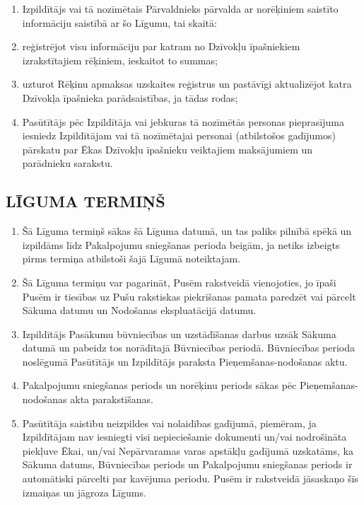 \begin{multicols}{2}
\begin{enumerate}
	\item Izpildītājs vai tā nozīmētais Pārvaldnieks pārvalda ar norēķiniem saistīto informāciju saistībā ar šo Līgumu, tai skaitā:
	\item reģistrējot visu informāciju par katram no Dzīvokļu īpašniekiem izrakstītajiem rēķiniem, ieskaitot to summas;
	\item uzturot Rēķinu apmaksas uzskaites reģistrus un pastāvīgi aktualizējot katra Dzīvokļa īpašnieka parādsaistības, ja tādas rodas;
	\item Pasūtītājs pēc Izpildītāja vai jebkuras tā nozīmētās personas pieprasījuma iesniedz Izpildītājam vai tā nozīmētajai personai (atbilstošos gadījumos) pārskatu par Ēkas Dzīvokļu īpašnieku veiktajiem maksājumiem un parādnieku sarakstu.
\end{enumerate}

\subsection{LĪGUMA TERMIŅŠ}
\begin{enumerate}
	\item Šā Līguma termiņš sākas šā Līguma datumā, un tas paliks pilnībā spēkā un izpildāms līdz Pakalpojumu sniegšanas perioda beigām, ja netiks izbeigts pirms termiņa atbilstoši šajā Līgumā noteiktajam.
	\item Šā Līguma termiņu var pagarināt, Pusēm rakstveidā vienojoties, jo īpaši Pusēm ir tiesības uz Pušu rakstiskas piekrišanas pamata paredzēt vai pārcelt Sākuma datumu un Nodošanas ekspluatācijā datumu.
	\item Izpildītājs Pasākumu būvniecības un uzstādīšanas darbus uzsāk Sākuma datumā un pabeidz tos norādītajā Būvniecības periodā. Būvniecības perioda noslēgumā Pasūtītājs un Izpildītājs paraksta Pieņemšanas-nodošanas aktu.
	\item Pakalpojumu sniegšanas periods un norēķinu periods sākas pēc Pieņemšanas-nodošanas akta parakstīšanas.
	\item Pasūtītāja saistību neizpildes vai nolaidības gadījumā, piemēram, ja Izpildītājam nav iesniegti visi nepieciešamie dokumenti un/vai nodrošināta piekļuve Ēkai, un/vai Nepārvaramas varas apstākļu gadījumā uzskatāms, ka Sākuma datums, Būvniecības periods un Pakalpojumu sniegšanas periods ir automātiski pārcelti par kavējuma periodu. Pusēm ir rakstveidā jāsaskaņo šīs izmaiņas un jāgroza Līgums.
\end{enumerate}


\end{multicols}
